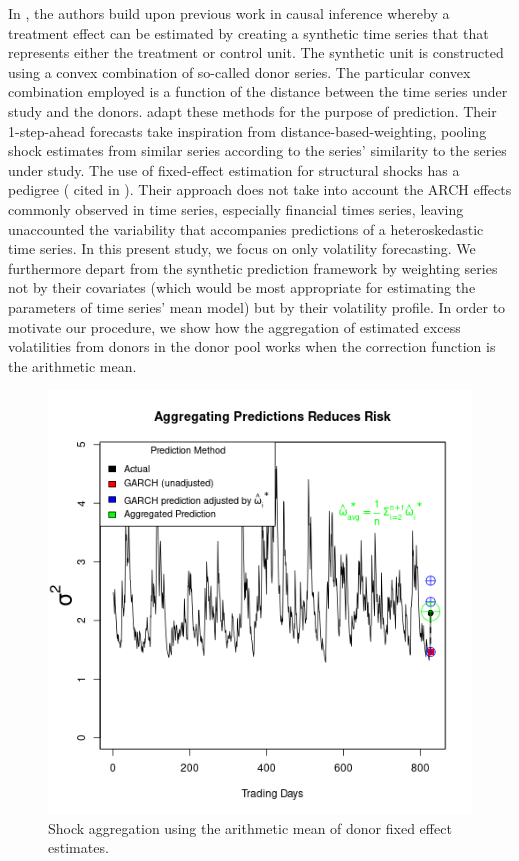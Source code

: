 \documentclass[11pt]{article}
\theoremstyle{definition}
\begin{document}
In \citet{abadie2010synthetic}, the authors build upon previous work in causal inference whereby a treatment effect can be estimated by creating a synthetic time series that that represents either the treatment or control unit.  The synthetic unit is constructed using a convex combination of so-called donor series.  The particular convex combination employed is a function of the distance between the time series under study and the donors. \citet{lin2021minimizing} adapt these methods for the purpose of prediction.  Their 1-step-ahead forecasts take inspiration from distance-based-weighting, pooling shock estimates from similar series according to the series' similarity to the series under study.  The use of fixed-effect estimation for structural shocks has a pedigree (\citet{romer1989does} cited in \citet{kilian2017structural}).  Their approach does not take into account the ARCH effects commonly observed in time series, especially financial times series, leaving unaccounted the variability that accompanies predictions of a heteroskedastic time series.  In this present study, we focus on only volatility forecasting.  We furthermore depart from the synthetic prediction framework by weighting series not by their covariates (which would be most appropriate for estimating the parameters of time series' mean model) but by their volatility profile.  In order to motivate our procedure, we show how the aggregation of estimated excess volatilities from donors in the donor pool works when the correction function is the arithmetic mean.

\begin{figure}[h]
  \begin{center}
    \includegraphics[scale=.7]{simulation_plots/USE_in_paper_simulation_plot_arithmetic_mean.png}
    \caption{Shock aggregation using the arithmetic mean of donor fixed effect estimates.}
    \label{fig:arith_mean_example_introduction}
    \end{center}
  \end{figure}
  
\end{document}
